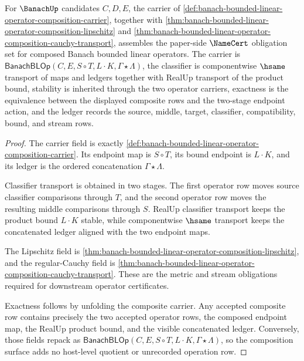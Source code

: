 \begin{theorem}
\label{thm:banach-bounded-linear-operator-composition-namecert-obligations}
For $\BanachUp$ candidates $C,D,E$, the carrier of
\autoref{def:banach-bounded-linear-operator-composition-carrier}, together
with
\autoref{thm:banach-bounded-linear-operator-composition-lipschitz} and
\autoref{thm:banach-bounded-linear-operator-composition-cauchy-transport},
assembles the paper-side $\NameCert$ obligation set for composed Banach
bounded linear operators. The carrier is
$\mathsf{BanachBLOp}(C,E,S\circ T,L\cdot K,\Gamma\star\Lambda)$, the
classifier is componentwise $\hsame$ transport of maps and ledgers together
with RealUp transport of the product bound, stability is inherited through
the two operator carriers, exactness is the equivalence between the displayed
composite rows and the two-stage endpoint action, and the ledger records the
source, middle, target, classifier, compatibility, bound, and stream rows.
\end{theorem}
\begin{proof}
The carrier field is exactly
\autoref{def:banach-bounded-linear-operator-composition-carrier}. Its endpoint
map is $S\circ T$, its bound endpoint is $L\cdot K$, and its ledger is the
ordered concatenation $\Gamma\star\Lambda$.

Classifier transport is obtained in two stages. The first operator row moves
source classifier comparisons through $T$, and the second operator row moves
the resulting middle comparisons through $S$. RealUp classifier transport
keeps the product bound $L\cdot K$ stable, while componentwise $\hsame$
transport keeps the concatenated ledger aligned with the two endpoint maps.

The Lipschitz field is
\autoref{thm:banach-bounded-linear-operator-composition-lipschitz}, and the
regular-Cauchy field is
\autoref{thm:banach-bounded-linear-operator-composition-cauchy-transport}.
These are the metric and stream obligations required for downstream operator
certificates.

Exactness follows by unfolding the composite carrier. Any accepted composite
row contains precisely the two accepted operator rows, the composed endpoint
map, the RealUp product bound, and the visible concatenated ledger. Conversely,
those fields repack as
$\mathsf{BanachBLOp}(C,E,S\circ T,L\cdot K,\Gamma\star\Lambda)$, so the
composition surface adds no host-level quotient or unrecorded operation row.
\end{proof}

